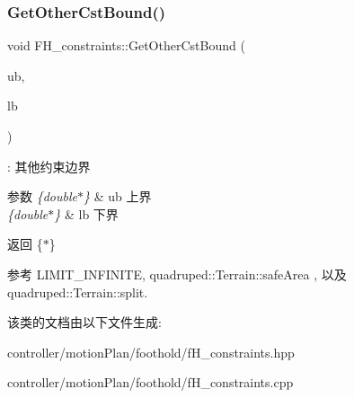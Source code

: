\subsubsection{\texorpdfstring{Get\+Other\+Cst\+Bound()}{GetOtherCstBound()}}
{\footnotesize\ttfamily void F\+H\+\_\+constraints\+::\+Get\+Other\+Cst\+Bound (\begin{DoxyParamCaption}\item[{double $\ast$}]{ub,  }\item[{double $\ast$}]{lb }\end{DoxyParamCaption})}

\+: 其他约束边界 
\begin{DoxyParams}{参数}
{\em \{double$\ast$\}} & ub 上界 \\
\hline
{\em \{double$\ast$\}} & lb 下界 \\
\hline
\end{DoxyParams}
\begin{DoxyReturn}{返回}
\{$\ast$\} 
\end{DoxyReturn}


参考 L\+I\+M\+I\+T\+\_\+\+I\+N\+F\+I\+N\+I\+TE, quadruped\+::\+Terrain\+::safe\+Area , 以及 quadruped\+::\+Terrain\+::split.



该类的文档由以下文件生成\+:\begin{DoxyCompactItemize}
\item 
controller/motion\+Plan/foothold/f\+H\+\_\+constraints.\+hpp\item 
controller/motion\+Plan/foothold/f\+H\+\_\+constraints.\+cpp\end{DoxyCompactItemize}
